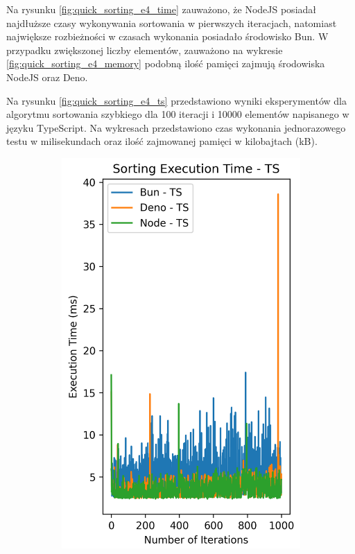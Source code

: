 Na rysunku \ref{fig:quick_sorting_e4_time} zauważono, że NodeJS posiadał najdłuższe czasy wykonywania sortowania w pierwszych iteracjach, natomiast największe rozbieżności w czasach wykonania posiadało środowisko Bun. W przypadku zwiększonej liczby elementów, zauważono na wykresie \ref{fig:quick_sorting_e4_memory} podobną ilość pamięci zajmują środowiska NodeJS oraz Deno.

Na rysunku \ref{fig:quick_sorting_e4_ts} przedstawiono wyniki eksperymentów dla algorytmu sortowania szybkiego dla 100 iteracji i 10000 elementów napisanego w języku TypeScript. Na wykresach przedstawiono czas wykonania jednorazowego testu w milisekundach oraz ilość zajmowanej pamięci w kilobajtach (kB).

\begin{figure}[H]
  \centering
  \begin{subfigure}[b]{0.42\textwidth}
    \centering
    \includegraphics[width=\textwidth]{Figures/sorting/sorting_quick_1000_10000_ts_time.png}

\end{subfigure}
\end{figure}
